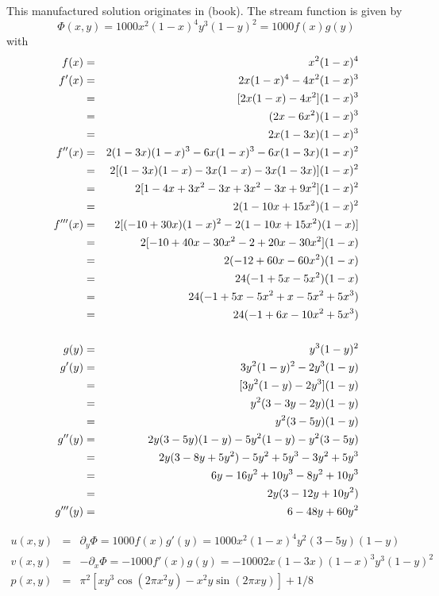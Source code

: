 
This manufactured solution originates in \textcite{john16} (book).
The stream function is given by
\[
\Phi(x,y) = 1000x^2(1-x)^4 y^3 (1-y)^2 = 1000 f(x)g(y)
\]
with 
\begin{eqnarray}
f(x)&=& x^2(1-x)^4 \nonumber\\
f'(x) 
&=& 2x (1-x)^4 - 4x^2 (1-x)^3 \nonumber\\
&=& [2x(1-x) -4x^2] (1-x)^3 \nonumber\\
&=& (2x-6x^2) (1-x)^3 \nonumber\\
&=& 2x(1-3x) (1-x)^3 \nonumber\\
f''(x) 
&=& 2(1-3x)(1-x)^3 -6x (1-x)^3 -6x(1-3x)(1-x)^2 \nonumber\\
&=& 2[ (1-3x)(1-x) -3x(1-x) -3x(1-3x)  ] (1-x)^2 \nonumber\\
&=& 2[ 1-4x+3x^2 -3x+3x^2 -3x+9x^2 ] (1-x)^2 \nonumber\\
&=& 2(1-10x+15x^2)(1-x)^2 \nonumber\\
f'''(x)
&=& 2[(-10+30x)(1-x)^2 -2 (1-10x+15x^2)(1-x)] \nonumber\\
&=& 2[-10+40x-30x^2  -2+20x-30x^2 ](1-x) \nonumber\\
&=& 2(-12+60x-60x^2 )(1-x) \nonumber\\
&=& 24 (-1+5x-5x^2 )(1-x) \nonumber\\
&=& 24(-1+5x-5x^2+x-5x^2+5x^3) \nonumber\\
&=& 24(-1+6x-10x^2+5x^3 ) \nonumber\\
\nonumber\\
g(y) &=& y^3(1-y)^2 \nonumber\\
g'(y) 
&=& 3y^2(1-y)^2 -2y^3 (1-y) \nonumber\\
&=& [3y^2(1-y) -2y^3] (1-y) \nonumber\\
&=& y^2 (3-3y-2y) (1-y) \nonumber\\
&=& y^2 (3-5y) (1-y) \nonumber\\
g''(y) 
&=& 2y (3-5y) (1-y) -5y^2  (1-y) -y^2 (3-5y)  \nonumber\\
&=& 2y(3-8y+5y^2) -5y^2 + 5y^3 - 3y^2 + 5y^3 \nonumber\\
&=& 6y -16y^2 + 10y^3 -8y^2 +10y^3 \nonumber\\
&=& 2y(3 -12y+10y^2) \nonumber\\
g'''(y) 
&=& 6 - 48y +60y^2 \nonumber
\end{eqnarray}

\begin{eqnarray}
u(x,y) 
&=& \partial_y \Phi 
= 1000 f(x) g'(y) = 1000 x^2(1-x)^4  y^2 (3-5y) (1-y) \\
v(x,y) &=& -\partial_x \Phi 
= -1000 f'(x) g(y)  = -1000 2x(1-3x) (1-x)^3  y^3(1-y)^2   \\
p(x,y) &=& \pi^2 [xy^3 \cos(2\pi x^2 y) - x^2y \sin(2\pi xy) ]+1/8
\end{eqnarray}

